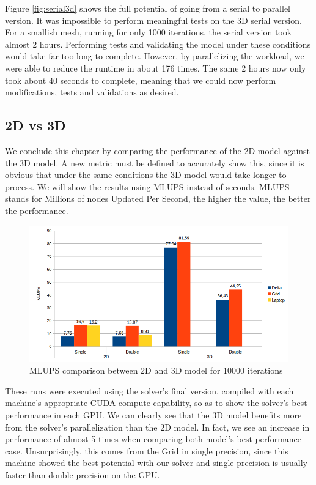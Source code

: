 \documentclass[12pt]{book}
\begin{document}
    Figure \ref{fig:serial3d} shows the full potential of going from a serial to parallel version. It was impossible to perform meaningful tests on the 3D serial version. For a smallish mesh, running for only 1000 iterations, the serial version took almost 2 hours. Performing tests and validating the model under these conditions would take far too long to complete. However, by parallelizing the workload, we were able to reduce the runtime in about 176 times. The same 2 hours now only took about 40 seconds to complete, meaning that we could now perform modifications, tests and validations as desired.

\subsection{2D vs 3D}
We conclude this chapter by comparing the performance of the 2D model against the 3D model. A new metric must be defined to accurately show this, since it is obvious that under the same conditions the 3D model would take longer to process. We will show the results using MLUPS instead of seconds. MLUPS stands for Millions of nodes Updated Per Second, the higher the value, the better the performance. 

    \begin{figure}[H]
    	\centering
    	\includegraphics[width=\linewidth]{Resources/Images/2dv3d.png}
    	\caption{MLUPS comparison between 2D and 3D model for 10000 iterations}
    	\label{fig:2dv3d}
    \end{figure}

These runs were executed using the solver's final version, compiled with each machine's appropriate CUDA compute capability, so as to show the solver's best performance in each GPU. We can clearly see that the 3D model benefits more from the solver's parallelization than the 2D model. In fact, we see an increase in performance of almost 5 times when comparing both model's best performance case. Unsurprisingly, this comes from the Grid in single precision, since this machine showed the best potential with our solver and single precision is usually faster than double precision on the GPU. 
\end{document}
